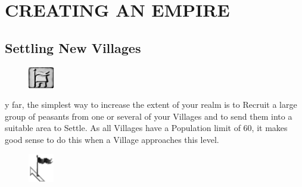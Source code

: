 
\chapter{\textsf{CREATING AN EMPIRE}}


\section{\textsf{Settling New Villages}}


\begin{figure}
    \vspace{-20pt}
    \begin{center}
        \includegraphics[width=0.1\textwidth]{Tsettle}
    \end{center}
    \vspace{-20pt}
\end{figure}

y far, the simplest way to increase the extent of your realm is to Recruit a large group of peasants from one or several of your Villages and to send them into a suitable area to Settle. As all Villages have a Population limit of 60, it makes good sense to do this when a Village approaches this level.

\begin{figure}
    \vspace{-20pt}
    \begin{center}
        \includegraphics[width=0.1\textwidth]{Bflag} %
    \end{center}
    \vspace{-20pt}
\end{figure}

